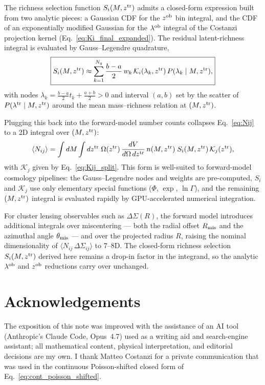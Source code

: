 \documentclass[a4paper, 11pt]{article}
\newcommand{\ltr}{\lambda^{\rm tr}}
\newcommand{\lob}{\lambda^{\rm ob}}
\newcommand{\ztr}{z^{\rm tr}}
\newcommand{\zob}{z^{\rm ob}}
\begin{document}
The richness selection function $S_i(M,\ztr)$ admits a closed-form expression built from two analytic pieces: a Gaussian CDF for the $\zob$ bin integral, and the CDF of an exponentially modified Gaussian for the $\lob$ integral of the Costanzi projection kernel (Eq.~\eqref{eq:Ki_final_expanded}). The residual latent-richness integral is evaluated by Gauss--Legendre quadrature,
\begin{equation}
\boxed{
S_i(M,\ztr)
\approx
\sum_{k=1}^{N_q}
\frac{b-a}{2}\,w_k\,
\mathcal K_i(\lambda_k,\ztr)\,
P(\lambda_k\mid M,\ztr),
}
\label{eq:final_weighted_sum}
\end{equation}
with nodes $\lambda_k=\tfrac{b-a}{2}t_k+\tfrac{a+b}{2}>0$ and interval $(a,b)$ set by the scatter of $P(\ltr\mid M,\ztr)$ around the mean mass--richness relation at $(M,\ztr)$.

Plugging this back into the forward-model number counts collapses Eq.~\eqref{eq:Nij} to a 2D integral over $(M,\ztr)$:
\begin{equation}
\langle N_{ij}\rangle
=
\int dM\int d\ztr\;
\Omega(\ztr)\,\frac{dV}{d\Omega\,d\ztr}\,n(M,\ztr)\;
S_i(M,\ztr)\,\mathcal K_j(\ztr),
\label{eq:Nij_2D}
\end{equation}
with $\mathcal K_j$ given by Eq.~\eqref{eq:Kij_split}. This form is well-suited to forward-model cosmology pipelines: the Gauss--Legendre nodes and weights are pre-computed, $S_i$ and $\mathcal K_j$ use only elementary special functions ($\Phi$, $\exp$, $\ln\Gamma$), and the remaining $(M,\ztr)$ integral is evaluated rapidly by GPU-accelerated numerical integration.

For cluster lensing observables such as $\Delta\Sigma(R)$, the forward model introduces additional integrals over miscentering --- both the radial offset $R_{\rm mis}$ and the azimuthal angle $\theta_{\rm mis}$ --- and over the projected radius $R$, raising the nominal dimensionality of $\langle N_{ij}\,\Delta\Sigma_{ij}\rangle$ to 7--8D. The closed-form richness selection $S_i(M,\ztr)$ derived here remains a drop-in factor in the integrand, so the analytic $\lob$ and $\zob$ reductions carry over unchanged.

\section*{Acknowledgements}

The exposition of this note was improved with the assistance of an AI tool (Anthropic's Claude Code, Opus~4.7) used as a writing aid and search-engine assistant; all mathematical content, physical interpretation, and editorial decisions are my own. I thank Matteo Costanzi for a private communication that was used in the continuous Poisson-shifted closed form of Eq.~\eqref{eq:cont_poisson_shifted}.
\end{document}
